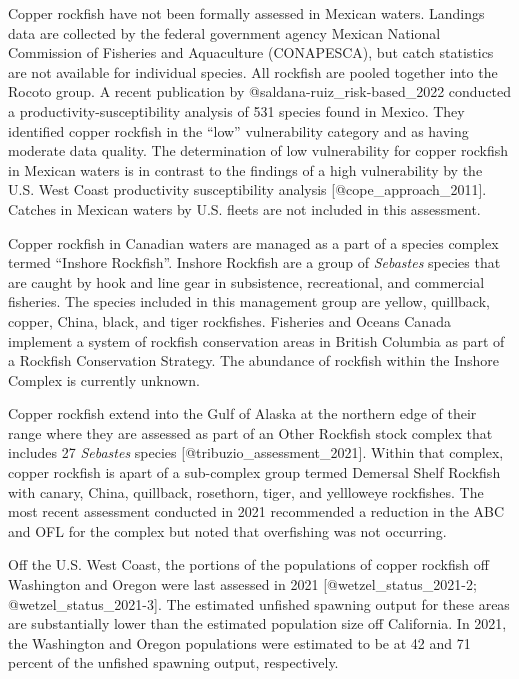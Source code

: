 \documentclass[11pt,
  letterpaper,
]{article}
\begin{document}
Copper rockfish have not been formally assessed in Mexican waters. Landings data are collected by the federal government agency Mexican National Commission of Fisheries and Aquaculture (CONAPESCA), but catch statistics are not available for individual species. All rockfish are pooled together into the Rocoto group. A recent publication by @saldana-ruiz\_risk-based\_2022 conducted a productivity-susceptibility analysis of 531 species found in Mexico. They identified copper rockfish in the ``low'' vulnerability category and as having moderate data quality. The determination of low vulnerability for copper rockfish in Mexican waters is in contrast to the findings of a high vulnerability by the U.S. West Coast productivity susceptibility analysis {[}@cope\_approach\_2011{]}. Catches in Mexican waters by U.S. fleets are not included in this assessment.

Copper rockfish in Canadian waters are managed as a part of a species complex termed ``Inshore Rockfish''. Inshore Rockfish are a group of \emph{Sebastes} species that are caught by hook and line gear in subsistence, recreational, and commercial fisheries. The species included in this management group are yellow, quillback, copper, China, black, and tiger rockfishes. Fisheries and Oceans Canada implement a system of rockfish conservation areas in British Columbia as part of a Rockfish Conservation Strategy. The abundance of rockfish within the Inshore Complex is currently unknown.

Copper rockfish extend into the Gulf of Alaska at the northern edge of their range where they are assessed as part of an Other Rockfish stock complex that includes 27 \emph{Sebastes} species {[}@tribuzio\_assessment\_2021{]}. Within that complex, copper rockfish is apart of a sub-complex group termed Demersal Shelf Rockfish with canary, China, quillback, rosethorn, tiger, and yellloweye rockfishes. The most recent assessment conducted in 2021 recommended a reduction in the ABC and OFL for the complex but noted that overfishing was not occurring.

Off the U.S. West Coast, the portions of the populations of copper rockfish off Washington and Oregon were last assessed in 2021 {[}@wetzel\_status\_2021-2; @wetzel\_status\_2021-3{]}. The estimated unfished spawning output for these areas are substantially lower than the estimated population size off California. In 2021, the Washington and Oregon populations were estimated to be at 42 and 71 percent of the unfished spawning output, respectively.
\end{document}

